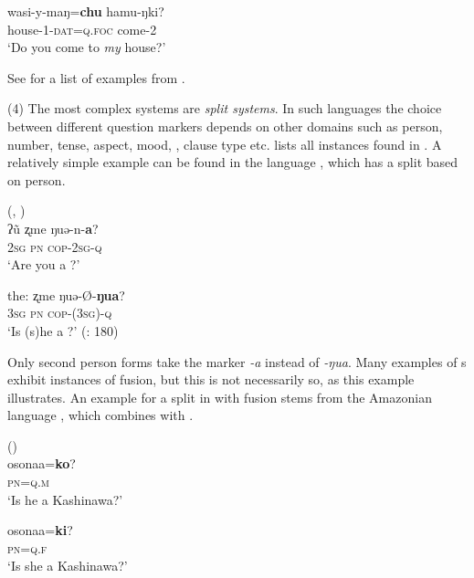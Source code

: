     \ex
    \gll wasi-y-maŋ=\textbf{{chu}} hamu-ŋki?\\
    house-1-\textsc{dat}=\textsc{q.foc}  come-2\\
    \glt ‘Do you come to \textit{my} house?’ \citep[29]{Ebina2011}
    \z
    \z

\noindent See  for a list of examples from .

         (4) The most complex  systems are \textit{split systems}. In such languages the choice between different question markers depends on other domains such as person, number, tense, aspect, mood, , clause type etc.  lists all instances found in . A relatively simple example can be found in the language  , which has a split based on person.

\ea%
    \label{ex:4:35}
     (, )\\
    \ea
    \gll ʔũ ʐme ŋuə-n-\textbf{a}?\\
    2\textsc{sg}  \textsc{pn}  \textsc{cop}-2\textsc{sg}-\textsc{q}\\
    \glt ‘Are you a ?’

    \ex
    \gll the:  ʐme  ŋuə-Ø-\textbf{{ŋua}}?\\
    \textsc{3sg}  \textsc{pn}  \textsc{cop-(3sg)}-\textsc{q}\\
    \glt ‘Is (s)he a ?’ (\citealt{LaPollaHuang2003}: 180)
    \z
    \z

\noindent Only second person  forms take the marker \textit{-a} instead of \textit{-ŋua}. Many examples of s exhibit instances of fusion, but this is not necessarily so, as this example illustrates. An example for a split in  with fusion stems from the Amazonian language  , which combines  with .

\ea%
    \label{ex:4:36}
     ()\\
    \ea
    \gll osonaa=\textbf{{ko}}?\\
    \textsc{pn=q.m}\\
    \glt ‘Is he a Kashinawa?’

    \ex
    \gll osonaa=\textbf{{ki}}?\\
    \textsc{pn=q.f}\\
    \glt ‘Is she a Kashinawa?’ \citep[193]{Dienst2014}
    \z
    \z

